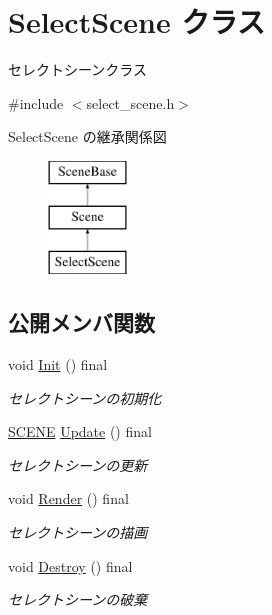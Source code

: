 \hypertarget{class_select_scene}{}\section{Select\+Scene クラス}
\label{class_select_scene}


セレクトシーンクラス  




{\ttfamily \#include $<$select\+\_\+scene.\+h$>$}

Select\+Scene の継承関係図\begin{figure}[H]
\begin{center}
\leavevmode
\includegraphics[height=3.000000cm]{class_select_scene}
\end{center}
\end{figure}
\subsection*{公開メンバ関数}
\begin{DoxyCompactItemize}
\item 
void \mbox{\hyperlink{class_select_scene_a20b3a902b5521d7494ed353731b3065d}{Init}} () final
\begin{DoxyCompactList}\small\item\em セレクトシーンの初期化 \end{DoxyCompactList}\item 
\mbox{\hyperlink{scene__base_8h_a24cee5343fb9d0706ead6e8601f363be}{S\+C\+E\+NE}} \mbox{\hyperlink{class_select_scene_a963eef40b6cae9667a66c5a517b66ab8}{Update}} () final
\begin{DoxyCompactList}\small\item\em セレクトシーンの更新 \end{DoxyCompactList}\item 
void \mbox{\hyperlink{class_select_scene_a85445536ad84d5232c724ecb7d48b8aa}{Render}} () final
\begin{DoxyCompactList}\small\item\em セレクトシーンの描画 \end{DoxyCompactList}\item 
void \mbox{\hyperlink{class_select_scene_a938293516c0e1ae5bb09dbab81bc78d9}{Destroy}} () final
\begin{DoxyCompactList}\small\item\em セレクトシーンの破棄 \end{DoxyCompactList}\end{DoxyCompactItemize}
